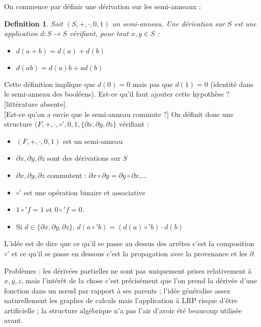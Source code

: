 \documentclass[11pt,a4paper]{article}
\newtheorem{definition}{Definition}
\begin{document}
	On commence par définir une dérivation sur les semi-anneaux :
	
	\begin{definition}
	
		Soit $(S,+,\cdot,0,1)$ un semi-anneau. Une dérivation sur $S$ est une application $d:S \to S$ vérifiant, pour tout $x,y \in S$ :
		\begin{itemize}
		 	\item $d(a+b)=d(a)+d(b)$
		 	\item $d(ab)=d(a)b+ad(b)$
		\end{itemize}

	\end{definition}
	
	Cette définition implique que $d(0)=0$ mais pas que $d(1)=0$ (identité dans le semi-anneau des booléens). Est-ce qu'il faut ajouter cette hypothèse ? [littérature absente].
	\\
	
	[Est-ce qu'on a envie que le semi-anneau commute ?]
	On définit donc une structure $(F,+,\cdot,\circ',0,1,\{\partial x, \partial y,\partial z \} $ vérifiant :
	\begin{itemize}
	
		\item $(F,+,\cdot,0,1)$ est un semi-anneau
		
		\item $\partial x, \partial y, \partial z$ sont des dérivations sur $S$
		
		\item $\partial x, \partial y, \partial z$ commutent : $\partial x \circ \partial y = \partial y \circ \partial x$,...
		
		\item $\circ'$ est une opération binaire et associative
		
		\item $1 \circ' f = 1$ et $0 \circ' f = 0$.
		
		\item Si $d \in \{\partial x, \partial y,\partial z \}$, $d(a \circ' b)=(d(a)\circ'b)\cdot d(b)$
	
	\end{itemize}
	
	L'idée est de dire que ce qu'il se passe au dessus des arrêtes c'est la composition $\circ'$ et ce qu'il se passe en dessous c'est la propagation avec la provenance et les $\partial$.
	
	Problèmes : les dérivées partielles ne sont pas uniquement prises relativement à $x,y,z$, mais l'intérêt de la chose c'est précisément que l'on prend la dérivée d'une fonction dans un n\oe ud par rapport à ses parents ; l'idée généralise assez naturellement les graphes de calculs mais l'application à LRP risque d'être artificielle ; la structure algébrique n'a pas l'air d'avoir été beaucoup utilisée avant.
\end{document}
